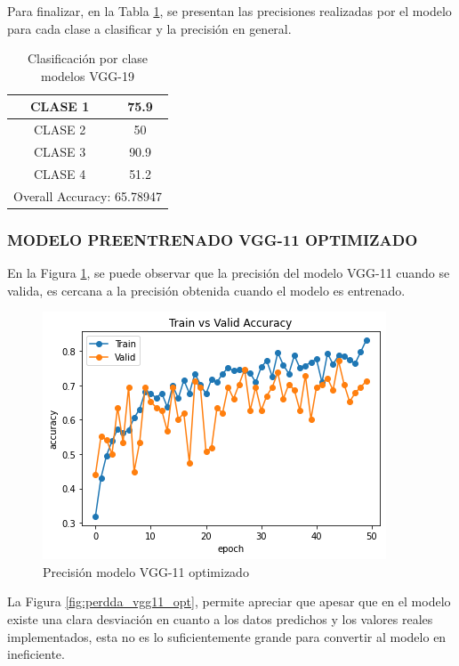 \newpage
Para finalizar, en la Tabla \ref{tab:VGG19optclases}, se presentan las precisiones realizadas por el modelo para cada clase a clasificar y la precisión en general.
\begin{table}[htbp]
	\centering
	\begin{tabular}{|c|c|}
		\hline
		CLASE 1 & 75.9 \bigstrut\\
		\hline
		CLASE 2 & 50 \bigstrut\\
		\hline
		CLASE 3 & 90.9 \bigstrut\\
		\hline
		CLASE 4 & 51.2 \bigstrut\\
		\hline
		\multicolumn{2}{|c|}{Overall Accuracy: 65.78947} \bigstrut\\
		\hline
	\end{tabular}%
	\caption{Clasificación por clase modelos VGG-19}
	\label{tab:VGG19optclases}%
\end{table}%

\subsubsection{\MakeUppercase{Modelo preentrenado VGG-11 optimizado}}
En la Figura \ref{fig:preci_vgg11_OPT}, se puede observar que la precisión del modelo VGG-11 cuando se valida, es cercana a la precisión obtenida cuando el modelo es entrenado.

\begin{figure}[ht]
	\centering
	\includegraphics[scale=0.6]{Figs/508.png}
	\caption{Precisión modelo VGG-11 optimizado}
	\label{fig:preci_vgg11_OPT}
\end{figure}

La Figura \ref{fig:perdda_vgg11_opt}, permite apreciar que apesar que en el modelo existe una clara desviación en cuanto a los datos predichos y los valores reales implementados, esta no es lo suficientemente grande para convertir al modelo en ineficiente.

